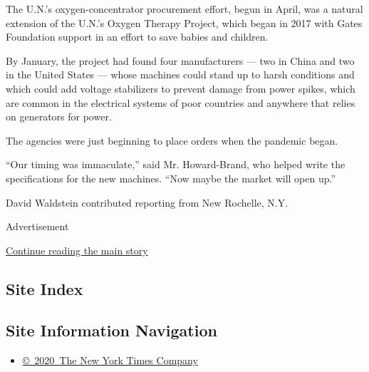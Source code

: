 The U.N.'s oxygen-concentrator procurement effort, begun in April, was a
natural extension of the U.N.'s Oxygen Therapy Project, which began in
2017 with Gates Foundation support in an effort to save babies and
children.

By January, the project had found four manufacturers --- two in China
and two in the United States --- whose machines could stand up to harsh
conditions and which could add voltage stabilizers to prevent damage
from power spikes, which are common in the electrical systems of poor
countries and anywhere that relies on generators for power.

The agencies were just beginning to place orders when the pandemic
began.

``Our timing was immaculate,'' said Mr. Howard-Brand, who helped write
the specifications for the new machines. ``Now maybe the market will
open up.''

David Waldstein contributed reporting from New Rochelle, N.Y.

Advertisement

\protect\hyperlink{after-bottom}{Continue reading the main story}

\hypertarget{site-index}{%
\subsection{Site Index}\label{site-index}}

\hypertarget{site-information-navigation}{%
\subsection{Site Information
Navigation}\label{site-information-navigation}}

\begin{itemize}
\tightlist
\item
  \href{https://help.nytimes3xbfgragh.onion/hc/en-us/articles/115014792127-Copyright-notice}{©~2020~The
  New York Times Company}
\end{itemize}

